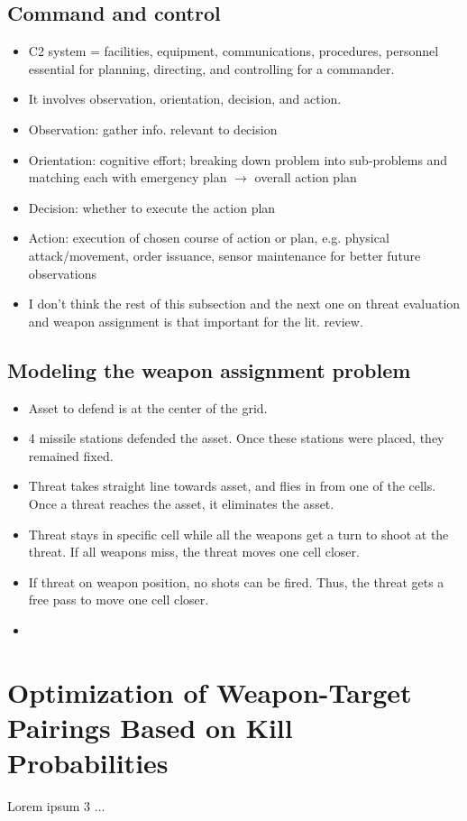 \documentclass[12pt]{article} %
\begin{document}
\subsection*{Command and control}
\begin{itemize}
\item C2 system = facilities, equipment, communications, procedures, personnel essential for planning, directing, and controlling 
for a commander.
\item It involves observation, orientation, decision, and action. 
\item Observation: gather info. relevant to decision
\item Orientation: cognitive effort; breaking down problem into sub-problems and matching each with emergency plan $\rightarrow$ overall action plan 
\item Decision: whether to execute the action plan 
\item Action: execution of chosen course of action or plan, e.g. physical attack/movement, order issuance, sensor maintenance for better future observations
\item I don't think the rest of this subsection and the next one on threat evaluation and weapon assignment is that important for the lit. review.
\end{itemize}

\subsection*{Modeling the weapon assignment problem}
\begin{itemize}
    \item Asset to defend is at the center of the grid.
    \item 4 missile stations defended the asset. Once these stations were placed, they remained fixed.
    \item Threat takes straight line towards asset, and flies in from one of the cells. Once a threat reaches the asset, it eliminates the asset.
    \item Threat stays in specific cell while all the weapons get a turn to shoot at the threat. If all weapons miss, the threat moves one cell closer.
    \item If threat on weapon position, no shots can be fired. Thus, the threat gets a free pass to move one cell closer.
    \item 
\end{itemize}


\section*{Optimization of Weapon-Target Pairings Based on Kill Probabilities \cite{killProbs_bogdanowicz_2013}}
Lorem ipsum 3 $\ldots$
\end{document}

